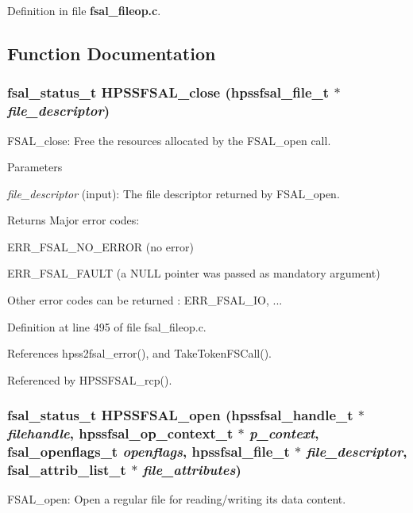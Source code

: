 Definition in file {\bf fsal\_\-fileop.c}.

\subsection{Function Documentation}
\subsubsection[{HPSSFSAL\_\-close}]{\setlength{\rightskip}{0pt plus 5cm}fsal\_\-status\_\-t HPSSFSAL\_\-close (hpssfsal\_\-file\_\-t $\ast$ {\em file\_\-descriptor})}\label{fsal__fileop_8c_ad1c5e042a4a4f42637da46c858997520}
FSAL\_\-close: Free the resources allocated by the FSAL\_\-open call.


\begin{DoxyParams}{Parameters}
\item[{\em file\_\-descriptor}](input): The file descriptor returned by FSAL\_\-open.\end{DoxyParams}
\begin{DoxyReturn}{Returns}
Major error codes:
\begin{DoxyItemize}
\item ERR\_\-FSAL\_\-NO\_\-ERROR (no error)
\item ERR\_\-FSAL\_\-FAULT (a NULL pointer was passed as mandatory argument)
\item Other error codes can be returned : ERR\_\-FSAL\_\-IO, ... 
\end{DoxyItemize}
\end{DoxyReturn}


Definition at line 495 of file fsal\_\-fileop.c.

References hpss2fsal\_\-error(), and TakeTokenFSCall().

Referenced by HPSSFSAL\_\-rcp().
\subsubsection[{HPSSFSAL\_\-open}]{\setlength{\rightskip}{0pt plus 5cm}fsal\_\-status\_\-t HPSSFSAL\_\-open (hpssfsal\_\-handle\_\-t $\ast$ {\em filehandle}, \/  hpssfsal\_\-op\_\-context\_\-t $\ast$ {\em p\_\-context}, \/  fsal\_\-openflags\_\-t {\em openflags}, \/  hpssfsal\_\-file\_\-t $\ast$ {\em file\_\-descriptor}, \/  fsal\_\-attrib\_\-list\_\-t $\ast$ {\em file\_\-attributes})}\label{fsal__fileop_8c_a0aafe8a952efc9f73a290f7dc94a2129}
FSAL\_\-open: Open a regular file for reading/writing its data content.


